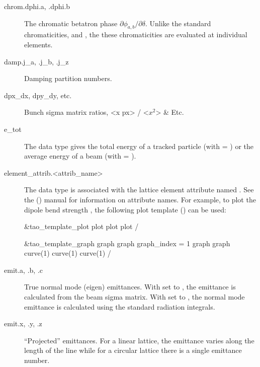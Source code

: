 \begin{description}
  \item[chrom.dphi.a, .dphi.b] \Newline
The chromatic betatron phase $\partial\phi_{a,b}/\partial\delta$. Unlike the standard
chromaticities, and , the these chromaticities are evaluated at
individual elements.

  \item[damp.j_a, .j_b, .j_z] \Newline
Damping partition numbers.

  \item[dpx_dx, dpy_dy, etc.] \Newline
Bunch sigma matrix ratios, <x px> / <$x^2$> \& Etc.

  \item[e_tot] \Newline
The  data type gives the total energy of a tracked particle (with
 = ) or the average energy of a beam (with  =
).

  \item[element_attrib.<attrib_name>] \Newline
The  data type is associated with the
lattice element attribute named . See the \bmad
(\cite{b:bmad}) manual for information on attribute names. For
example, to plot the dipole bend strength , the following
plot template () can be used:
\begin{example}
  &tao_template_plot
    plot%
    plot%
    plot%
  /

  &tao_template_graph
    graph%
    graph%
    graph_index = 1
    graph%
    graph%
    curve(1)%
    curve(1)%
    curve(1)%
  /
\end{example}

  \item[emit.a, .b, .c] \Newline
True normal mode (eigen) emittances.  With  set to , the
emittance is calculated from the beam sigma matrix. With  set to
, the normal mode emittance is calculated using the standard radiation
integrals.

  \item[emit.x, .y, .z] \Newline
``Projected'' emittances\cite{b:emit}. 
For a linear lattice, the emittance varies along the length
of the line while for a circular lattice there is a single emittance
number. 


\end{description}
